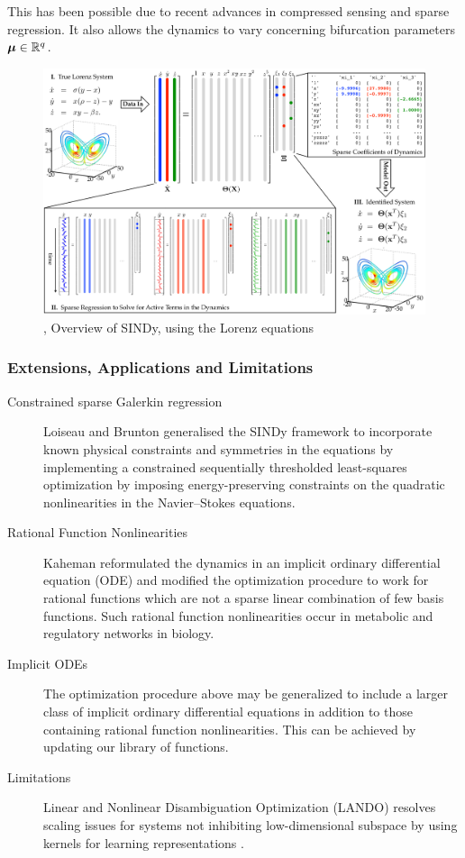 This has been possible due to recent advances in compressed sensing and sparse regression. It also allows the dynamics to vary concerning bifurcation parameters $\boldsymbol{\mu}\in\mathbb{R}^q$.  
\begin{figure}[H]
    \centering
    \includegraphics[width=\linewidth]{Images/FIG00_BIG4.png}
    \caption{\cite{SINDy}, Overview of SINDy, using the Lorenz equations}
    \label{fig:sindydemo}
\end{figure}
\subsubsection{Extensions, Applications and Limitations}
\begin{description}
    \item[Constrained sparse Galerkin regression] Loiseau and Brunton \cite{loiseau2016constrained} generalised the SINDy framework to incorporate known physical constraints and symmetries in the equations by implementing a constrained sequentially thresholded least-squares optimization by imposing energy-preserving constraints on the quadratic nonlinearities in the Navier–Stokes equations.
    \item[Rational Function Nonlinearities] Kaheman \cite{Kaheman2020} reformulated the dynamics in an implicit ordinary differential equation (ODE) and modified the optimization procedure to work for rational functions which are not a sparse linear combination of few basis functions. Such rational function nonlinearities occur in metabolic and regulatory networks in biology.
    \item[Implicit ODEs] The optimization procedure above may be generalized to include a larger class of implicit ordinary differential equations in addition to those containing rational function nonlinearities. This can be achieved by updating our library of functions.
    \item[Limitations] Linear and Nonlinear Disambiguation Optimization (LANDO) \cite{Baddoo2022} resolves scaling issues for systems not inhibiting low-dimensional subspace by using kernels for learning representations \cite{brunton2021modern}.
\end{description}
